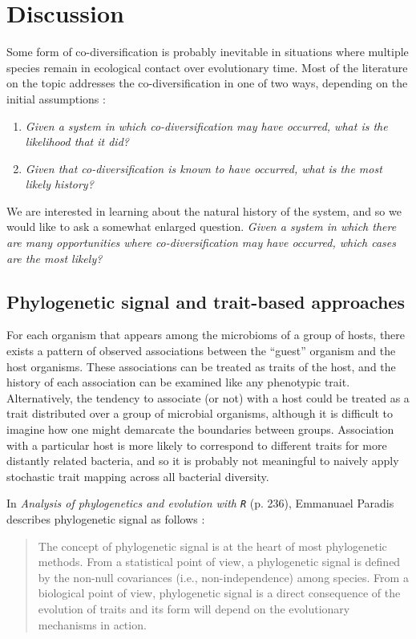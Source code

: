 \section{Discussion}

Some form of co-diversification is probably inevitable in situations where multiple species remain in ecological contact over evolutionary time. Most of the literature on the topic addresses the co-diversification in one of two ways, depending on the initial assumptions :

\begin{enumerate}
    \item {\em Given a system in which co-diversification may have occurred, what is the likelihood that it did?}
    
    \item {\em Given that co-diversification is known to have occurred, what is the most likely history?}
\end{enumerate}

We are interested in learning about the natural history of the system, and so we would like to ask a somewhat enlarged question. {\em Given a system in which there are many opportunities where co-diversification may have occurred, which cases are the most likely?} 

\subsection{Phylogenetic signal and trait-based approaches}

For each organism that appears among the microbioms of a group of hosts, there exists a pattern of observed associations between the ``guest'' organism and the host organisms. These associations can be treated as traits of the host, and the history of each association can be examined like any phenotypic trait. Alternatively, the tendency to associate (or not) with a host could be treated as a trait distributed over a group of microbial organisms, although it is difficult to imagine how one might demarcate the boundaries between groups. Association with a particular host is more likely to correspond to different traits for more distantly related bacteria, and so it is probably not meaningful to naively apply stochastic trait mapping across all bacterial diversity.

In {\em Analysis of phylogenetics and evolution with {\tt R}} (p. 236), Emmanuael Paradis describes phylogenetic signal as follows :

\begin{quote}
The concept of phylogenetic signal is at the heart of most phylogenetic methods. From a statistical point of view, a phylogenetic signal is defined by the non-null covariances (i.e., non-independence) among species. From a biological point of view, phylogenetic signal is a direct consequence of the evolution of traits and its form will depend on the evolutionary mechanisms in action.
\end{quote}

